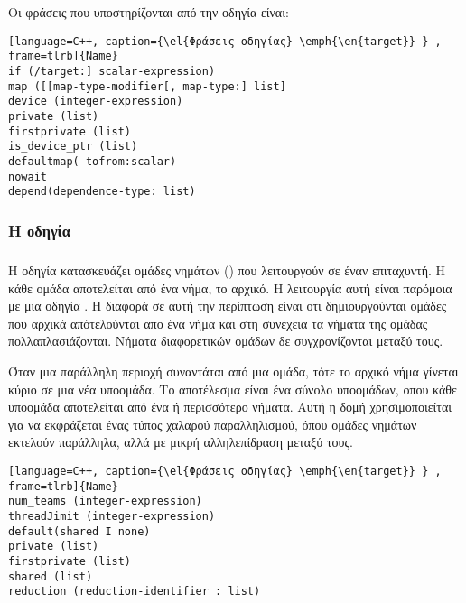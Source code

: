 Οι φράσεις που υποστηρίζονται από την οδηγία είναι:

\begin{spacing}{1.1}
\begin{lstlisting}[language=C++, caption={\el{Φράσεις οδηγίας} \emph{\en{target}} } , frame=tlrb]{Name}
if (/target:] scalar-expression)
map ([[map-type-modifier[, map-type:] list]
device (integer-expression)
private (list)
firstprivate (list)
is_device_ptr (list)
defaultmap( tofrom:scalar)
nowait
depend(dependence-type: list)
\end{lstlisting}
\end{spacing}

\subsubsection{Η οδηγία }
\subparagraph{}
Η οδηγία \emph{} κατασκευάζει ομάδες νημάτων (\emph{}) που λειτουργούν σε έναν επιταχυντή. Η κάθε ομάδα αποτελείται από ένα νήμα, το αρχικό. Η λειτουργία αυτή είναι παρόμοια με μια οδηγία \emph{}. H διαφορά σε αυτή την περίπτωση είναι οτι δημιουργούνται ομάδες που αρχικά απότελούνται απο ένα νήμα και στη συνέχεια τα νήματα της ομάδας πολλαπλασιάζονται. Νήματα διαφορετικών ομάδων δε συγχρονίζονται μεταξύ τους.

Όταν μια παράλληλη περιοχή συναντάται από μια ομάδα, τότε το αρχικό νήμα γίνεται κύριο σε μια νέα υποομάδα. Το αποτέλεσμα είναι ένα σύνολο υποομάδων, οπου κάθε υποομάδα αποτελείται από ένα ή περισσότερο νήματα. Αυτή η δομή χρησιμοποιείται για να εκφράζεται ένας τύπος χαλαρού παραλληλισμού, όπου ομάδες νημάτων εκτελούν παράλληλα, αλλά με μικρή αλληλεπίδραση μεταξύ τους.



\begin{lstlisting}[language=C++, caption={\el{Φράσεις οδηγίας} \emph{\en{target}} } , frame=tlrb]{Name}
num_teams (integer-expression)
threadJimit (integer-expression)
default(shared I none)
private (list)
firstprivate (list)
shared (list)
reduction (reduction-identifier : list)
\end{lstlisting}
\clearpage
